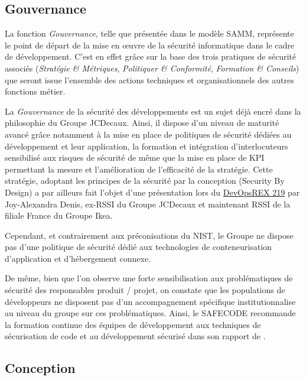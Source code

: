 \subsection{Gouvernance}

La fonction \emph{Gouvernance}, telle que présentée dans le modèle \ac{SAMM}, représente le point de départ de la 
mise en œuvre de la sécurité informatique dans le cadre de développement. C'est en effet grâce sur la base des 
trois pratiques de sécurité associés (\emph{Stratégie \& Métriques}, \emph{Politiquer \& Conformité}, 
\emph{Formation \& Conseils}) que seront issue l'ensemble des actions techniques et organisationnels des autres
fonctions métier.

La \emph{Gouvernance} de la sécurité des développements est un sujet déjà encré dans la philosophie du Groupe JCDecaux.
Ainsi, il dispose d'un niveau de maturité avancé grâce notamment à la mise en place de politiques de sécurité dédiées
au développement et leur application, la formation et intégration d'interlocuteurs sensibilisé aux risques de sécurité
de même que la mise en place de \ac{KPI} permettant la mesure et l'amélioration de l'efficacité de la stratégie.
Cette stratégie, adoptant les principes de la sécurité par la conception (Security By Design) a par ailleurs fait 
l'objet d'une présentation\autocite{devopsrex_denis_2019} lors du \href{https://2019.devopsrex.fr/}{DevOpsREX 219} 
par Joy-Alexandra Denis, ex-RSSI du Groupe JCDecaux et maintenant RSSI de la filiale France du Groupe Ikea.

Cependant, et contrairement aux préconisations du \ac{NIST}\autocite*{app_cont_sec_nist_2017}, le Groupe ne dispose pas
d'une politique de sécurité dédié aux technologies de conteneurisation d'application et d'hébergement connexe. 

De même, bien que l'on observe une forte sensibilisation aux problématiques de sécurité des responsables produit / 
projet, on constate que les populations de développeurs ne disposent pas d'un accompagnement spécifique 
institutionnalise au niveau du groupe sur ces problématiques.
\newline Ainsi, le \ac{SAFECODE} recommande la formation continue des équipes de développement aux techniques de 
sécurisation de code et au développement sécurisé dans son rapport  de 
.

\newpage

\subsection{Conception}

